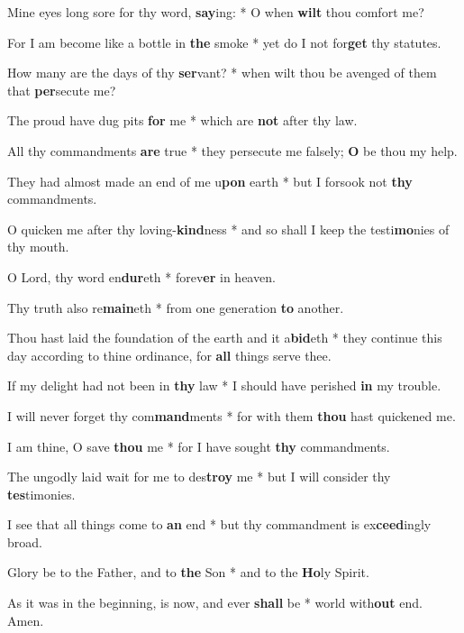 \begin{multicols}{2}
	Mine eyes long sore for thy word, \textbf{say}ing: * O when \textbf{wilt} thou comfort me?
	
	For I am become like a bottle in \textbf{the} smoke * yet do I not for\textbf{get} thy statutes.
	
	How many are the days of thy \textbf{ser}vant? * when wilt thou be avenged of them that \textbf{per}secute me?
	
	The proud have dug pits \textbf{for} me * which are \textbf{not} after thy law.
	
	All thy commandments \textbf{are} true * they persecute me falsely; \textbf{O} be thou my help.
	
	They had almost made an end of me u\textbf{pon} earth * but I forsook not \textbf{thy} commandments.
	
	O quicken me after thy loving-\textbf{kind}ness * and so shall I keep the testi\textbf{mo}nies of thy mouth.
	
	O Lord, thy word en\textbf{dur}eth * forev\textbf{er} in heaven.
	
	Thy truth also re\textbf{main}eth * from one generation \textbf{to} another.
	
	Thou hast laid the foundation of the earth and it a\textbf{bid}eth * they continue this day according to thine ordinance, for \textbf{all} things serve thee.
	
	If my delight had not been in \textbf{thy} law * I should have perished \textbf{in} my trouble.
	
	I will never forget thy com\textbf{mand}ments * for with them \textbf{thou} hast quickened me.
	
	I am thine, O save \textbf{thou} me * for I have sought \textbf{thy} commandments.
	
	The ungodly laid wait for me to des\textbf{troy} me * but I will consider thy \textbf{tes}timonies.
	
	I see that all things come to \textbf{an} end * but thy commandment is ex\textbf{ceed}ingly broad.
	
	Glory be to the Father, and to \textbf{the} Son * and to the \textbf{Ho}ly Spirit.
	
	As it was in the beginning, is now, and ever \textbf{shall} be * world with\textbf{out} end. Amen.
\end{multicols}